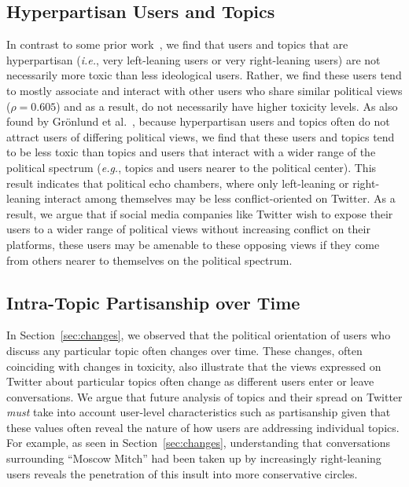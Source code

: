 

\subsection{Hyperpartisan Users and Topics}
In contrast to some prior work~\cite{nelimarkka2018social},  we find that users and topics that are hyperpartisan (\textit{i.e.}, very left-leaning users or very right-leaning users) are not necessarily more toxic than less ideological users. Rather, we find these users tend to mostly associate and interact with other users who share similar political views ($\rho=0.605$) and as a result, do not necessarily have higher toxicity levels. As also found by Gr{\"o}nlund et al.~\cite{gronlund2015does}, because hyperpartisan users and topics often do not attract users of differing political views, we find that these users and topics tend to be less toxic than topics and users that interact with a wider range of the political spectrum (\textit{e.g.}, topics and users nearer to the political center). This result indicates that political echo chambers, where only left-leaning or right-leaning interact among themselves may be less conflict-oriented on Twitter. As a result, we argue that if social media companies like Twitter wish to expose their users to a wider range of political views without increasing conflict on their platforms, these users may be amenable to these opposing views if they come from others nearer to themselves on the political spectrum.



\subsection{Intra-Topic Partisanship over Time}
In Section~\ref{sec:changes}, we observed that the political orientation of users who discuss any particular topic often changes over time. These changes, often coinciding with changes in toxicity, also illustrate that the views expressed on Twitter about particular topics often change as different users enter or leave conversations. We argue that future analysis of topics and their spread on Twitter \emph{must} take into account user-level characteristics such as partisanship given that these values often reveal the nature of how users are addressing individual topics. For example, as seen in Section~\ref{sec:changes}, understanding that conversations surrounding ``Moscow Mitch'' had been taken up by increasingly right-leaning users reveals the penetration of this insult into more conservative circles. 

